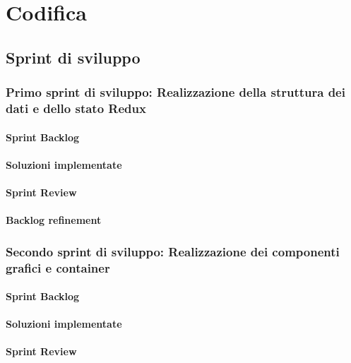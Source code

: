 
\chapter{Codifica}
\label{cap:codifica}

\section{Sprint di sviluppo}

\subsection{Primo sprint di sviluppo: Realizzazione della struttura dei dati e dello stato Redux}
\subsubsection{Sprint Backlog}
\subsubsection{Soluzioni implementate}
\subsubsection{Sprint Review}
\subsubsection{Backlog refinement}

\subsection{Secondo sprint di sviluppo: Realizzazione dei componenti grafici e container}
\subsubsection{Sprint Backlog}
\subsubsection{Soluzioni implementate}
\subsubsection{Sprint Review}
